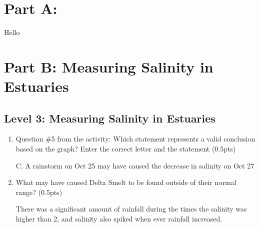 \documentclass[12pt,a4paper]{article}
\begin{document}
\raggedright
\section*{Part A: }
\begin{enumerate}[font=\bfseries, wide]
    {\color{gray}\item Hello}\par
\end{enumerate}
\section*{Part B: Measuring Salinity in Estuaries}
\subsection*{Level 3: Measuring Salinity in Estuaries}
\begin{enumerate}[font=\bfseries, wide, resume]
    \item Question \#5 from the activity: Which statement represents a valid conclusion based on the graph?  Enter the correct letter and the statement (0.5pts)\par

    C. A rainstorm on Oct 25 may have caused the decrease in salinity on Oct 27

    \item What may have caused Delta Smelt to be found outside of their normal range? (0.5pts)\par 

    There was a significant amount of rainfall during the times the salinity was higher than 2, and salinity also spiked when ever rainfall increased. 
\end{enumerate}
\end{document}
